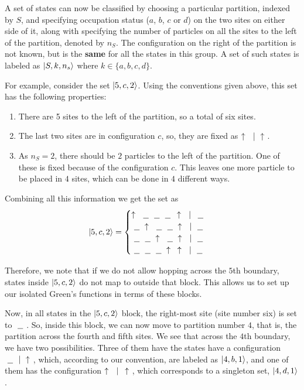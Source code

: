 	A set of states can now be classified by choosing a particular partition, indexed by $ S $, and specifying occupation status ($ a $, $ b $, $ c $ or $ d $) on the two sites on either side of it, along with specifying the number of particles on all the sites to the left of the partition, denoted by $ n_S $. The configuration on the right of the partition is not known, but is the \textbf{same} for all the states in this group. A set of such states is labeled as $ \ket{S, k, n_s} $ where $ k \in \{a, b, c, d\} $.
	
	For example, consider the set $ \ket{5,c,2} $. Using the conventions given above, this set has the following properties:
	\begin{enumerate}
		\item There are 5 sites to the left of the partition, so a total of six sites.
		\item The last two sites are in configuration $ c $, so, they are fixed as $ \uparrow\  \ |\  \uparrow\  $.
		\item As $ n_S = 2 $, there should be $ 2 $ particles to the left of the partition. One of these is fixed because of the configuration $ c $. This leaves one more particle to be placed in $ 4 $ sites, which can be done in $ 4 $ different ways.
\end{enumerate}	
	Combining all this information we get the set as
	\begin{align*}
		\ket{5,c,2} =
		\begin{cases}
			\uparrow\  \ \underline{\ \ }\  \ \underline{\ \ }\  \ \underline{\ \ }\  \,\uparrow\  \ |\ \, \ \underline{\ \ }\  \\
			\ \underline{\ \ }\  \uparrow\  \ \underline{\ \ }\  \ \underline{\ \ }\  \uparrow\  \ |\  \ \underline{\ \ }\  \\
			\ \underline{\ \ }\  \ \underline{\ \ }\  \uparrow\  \ \underline{\ \ }\  \uparrow\  \ |\  \ \underline{\ \ }\  \\
			\ \underline{\ \ }\  \ \underline{\ \ }\  \ \underline{\ \ }\  \uparrow\ \,\,\,\uparrow\  \ |\  \ \underline{\ \ }\  \\
		\end{cases}
	\end{align*}
	
	Therefore, we note that if we do not allow hopping across the $ 5 $th boundary, states inside $ \ket{5, c, 2} $ do not map to outside that block. This allows us to set up our isolated Green's functions in terms of these blocks.
	
	Now, in all states in the $ \ket{5, c, 2} $ block, the right-most site (site number six) is set to $ \ \underline{\ \ }\  $. So, inside this block, we can now move to partition number $ 4 $, that is, the partition across the fourth and fifth sites. We see that across the $ 4 $th boundary, we have two possibilities. Three of them have the states have a configuration $ \ \underline{\ \ }\  \ |\  \uparrow\  $, which, according to our convention, are labeled as $ \ket{4, b, 1} $, and one of them has the configuration $ \uparrow\  \ |\ \, \uparrow\  $, which corresponds to a singleton set, $ \ket{4, d, 1} $.
	
